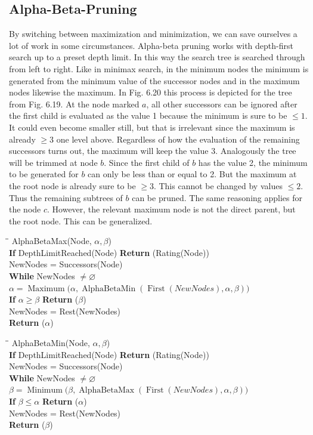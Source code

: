 \documentclass[10pt]{book}
\begin{document}
\subsection{Alpha-Beta-Pruning}
By switching between maximization and minimization, we can save ourselves a lot of work in some circumstances. Alpha-beta pruning works with depth-first search up to a preset depth limit. In this way the search tree is searched through from left to right. Like in minimax search, in the minimum nodes the minimum is generated from the minimum value of the successor nodes and in the maximum nodes likewise the maximum. In Fig. 6.20 this process is depicted for the tree from Fig. 6.19. At the node marked $a$, all other successors can be ignored after the first child is evaluated as the value 1 because the minimum is sure to be $\leq 1$. It could even become smaller still, but that is irrelevant since the maximum is already $\geq 3$ one level above. Regardless of how the evaluation of the remaining successors turns out, the maximum will keep the value 3. Analogously the tree will be trimmed at node $b$. Since the first child of $b$ has the value 2, the minimum to be generated for $b$ can only be less than or equal to 2. But the maximum at the root node is already sure to be $\geq 3$. This cannot be changed by values $\leq 2$. Thus the remaining subtrees of $b$ can be pruned.
The same reasoning applies for the node $c$. However, the relevant maximum node is not the direct parent, but the root node. This can be generalized.

\begin{tabbing}
\quad\=\quad\=\kill
AlphaBetaMax(Node, $\alpha, \beta$)\\
\textbf{If} DepthLimitReached(Node) \textbf{Return} (Rating(Node))\\
NewNodes = Successors(Node)\\
\textbf{While} NewNodes $\neq \varnothing$\\
\> $\alpha = \operatorname{Maximum}\!\bigl(\alpha, \operatorname{AlphaBetaMin}(\operatorname{First}(NewNodes), \alpha, \beta)\bigr)$\\
\> \textbf{If} $\alpha \geq \beta$ \textbf{Return} ($\beta$)\\
\> NewNodes = Rest(NewNodes)\\
\textbf{Return} ($\alpha$)
\end{tabbing}

\begin{tabbing}
\quad\=\quad\=\kill
AlphaBetaMin(Node, $\alpha, \beta$)\\
\textbf{If} DepthLimitReached(Node) \textbf{Return} (Rating(Node))\\
NewNodes = Successors(Node)\\
\textbf{While} NewNodes $\neq \varnothing$\\
\> $\beta = \operatorname{Minimum}\!\bigl(\beta, \operatorname{AlphaBetaMax}(\operatorname{First}(NewNodes), \alpha, \beta)\bigr)$\\
\> \textbf{If} $\beta \leq \alpha$ \textbf{Return} ($\alpha$)\\
\> NewNodes = Rest(NewNodes)\\
\textbf{Return} ($\beta$)
\end{tabbing}
\end{document}
